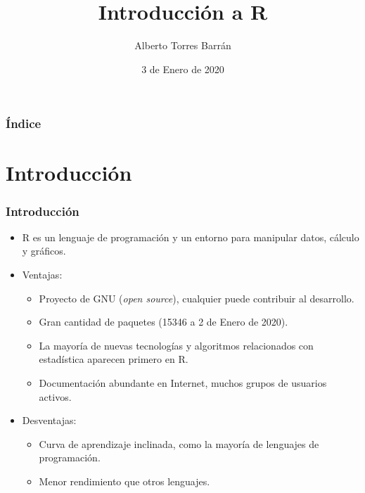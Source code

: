 \documentclass{beamer}
\title{Introducción a R}
\author{Alberto Torres Barrán}
\date{3 de Enero de 2020}
\begin{document}
\begin{frame}[plain]
\titlepage
\end{frame}

\begin{frame}[allowframebreaks]
	\frametitle{Índice}
    \tableofcontents[sections={1-4}]
      \framebreak
    \tableofcontents[sections={5-9}]
\end{frame}


\section{Introducción}

\begin{frame}
\frametitle{Introducción}

\begin{itemize}
\item R es un lenguaje de programación y un entorno para manipular datos, cálculo y gráficos.
\item Ventajas:
\begin{itemize}
\item Proyecto de GNU (\textit{open source}), cualquier puede contribuir al desarrollo.
\item Gran cantidad de paquetes (15346 a 2 de Enero de 2020).
\item La mayoría de nuevas tecnologías y algoritmos relacionados con estadística aparecen primero en R.
\item Documentación abundante en Internet, muchos grupos de usuarios activos.
\end{itemize}
\item Desventajas:
\begin{itemize}
\item Curva de aprendizaje inclinada, como la mayoría de lenguajes de programación.
\item Menor rendimiento que otros lenguajes.
\end{itemize}
\end{itemize}

\end{frame}
\end{document}
